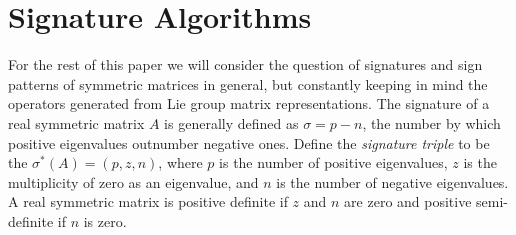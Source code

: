 \documentclass{acm_proc_article-sp}
\newcommand{\signature}{\ensuremath{\sigma^{*}}}
\newcommand{\p}{\ensuremath{p}}
\newcommand{\z}{\ensuremath{z}}
\newcommand{\n}{\ensuremath{n}}
\begin{document}
%
%
%
%
%
%
%


\section{Signature Algorithms} %

For the rest of this paper we will consider the question of signatures and
sign patterns
of symmetric matrices in general, but constantly keeping in mind the 
operators generated from Lie group matrix representations.
The signature of a real symmetric matrix $A$ is 
generally defined as $\sigma = \p - \n$, the number by which positive eigenvalues 
outnumber negative ones.  
Define the {\em signature triple} to be the 
$\signature(A) = (\p, \z, \n)$, 
where $\p$ is the number of positive eigenvalues, $\z$ is the 
multiplicity of zero as an eigenvalue, and $\n$ is the number of negative eigenvalues.
A real symmetric matrix is 
positive definite if $z$ and $n$ are zero and 
positive semi-definite if $n$ is zero.
\end{document}
